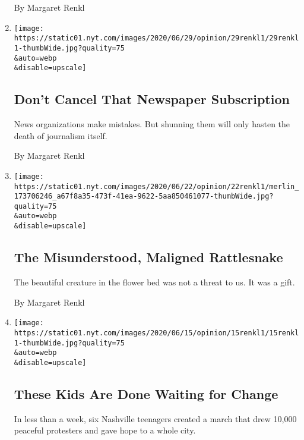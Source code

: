\begin{enumerate}
  By Margaret Renkl
\item
  \href{/2020/06/29/opinion/tennessean-newspaper.html}{}

  \texttt{[image: https://static01.nyt.com/images/2020/06/29/opinion/29renkl1/29renkl1-thumbWide.jpg?quality=75\\\&auto=webp\\\&disable=upscale]}

  \hypertarget{dont-cancel-that-newspaper-subscription}{%
  \subsection{Don't Cancel That Newspaper
  Subscription}\label{dont-cancel-that-newspaper-subscription}}

  News organizations make mistakes. But shunning them will only hasten
  the death of journalism itself.

  By Margaret Renkl
\item
  \href{/2020/06/22/opinion/rattlesnakes.html}{}

  \texttt{[image: https://static01.nyt.com/images/2020/06/22/opinion/22renkl1/merlin\_173706246\_a67f8a35-473f-41ea-9622-5aa850461077-thumbWide.jpg?quality=75\\\&auto=webp\\\&disable=upscale]}

  \hypertarget{the-misunderstood-maligned-rattlesnake}{%
  \subsection{The Misunderstood, Maligned
  Rattlesnake}\label{the-misunderstood-maligned-rattlesnake}}

  The beautiful creature in the flower bed was not a threat to us. It
  was a gift.

  By Margaret Renkl
\item
  \href{/2020/06/15/opinion/nashville-teens-protests.html}{}

  \texttt{[image: https://static01.nyt.com/images/2020/06/15/opinion/15renkl1/15renkl1-thumbWide.jpg?quality=75\\\&auto=webp\\\&disable=upscale]}

  \hypertarget{these-kids-are-done-waiting-for-change}{%
  \subsection{These Kids Are Done Waiting for
  Change}\label{these-kids-are-done-waiting-for-change}}

  In less than a week, six Nashville teenagers created a march that drew
  10,000 peaceful protesters and gave hope to a whole city.


\end{enumerate}
